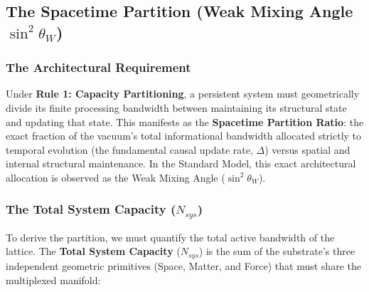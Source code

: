 \subsection{The Spacetime Partition (Weak Mixing Angle \texorpdfstring{$\sin^2 \theta_W$}{sin2thetaW})}
\label{subsec:spacetime_partition}


\subsubsection{The Architectural Requirement}

Under \textbf{Rule 1: Capacity Partitioning}, a persistent system must geometrically divide its finite processing bandwidth between maintaining its structural state and updating that state. This manifests as the \textbf{Spacetime Partition Ratio}: the exact fraction of the vacuum's total informational bandwidth allocated strictly to temporal evolution (the fundamental causal update rate, $\Delta$) versus spatial and internal structural maintenance. In the Standard Model, this exact architectural allocation is observed as the Weak Mixing Angle ($\sin^2 \theta_W$). 

\subsubsection{The Total System Capacity (\texorpdfstring{$N_{sys}$}{Nsys})}
To derive the partition, we must quantify the total active bandwidth of the lattice. The \textbf{Total System Capacity} ($N_{sys}$) is the sum of the substrate's three independent geometric primitives (Space, Matter, and Force) that must share the multiplexed manifold:

